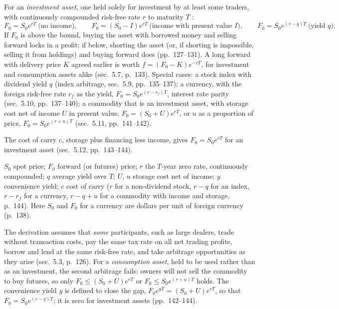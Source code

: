 \begin{qfresult}\label{res:cost-of-carry-forward-price}
 For an \emph{investment asset}, one held solely for investment by at least some traders, with continuously compounded risk-free rate $r$ to maturity $T$ \citep[chap.~5, ``Determination of Forward and Futures Prices'', secs.~5.1--5.6, pp.~124--132]{s7-hulloptions}:
\[ F_0=S_0e^{rT}\ \text{(no income)},\qquad F_0=(S_0-I)e^{rT}\ \text{(income with present value $I$)},\qquad F_0=S_0e^{(r-q)T}\ \text{(yield $q$)}. \]
If $F_0$ is above the bound, buying the asset with borrowed money and selling forward locks in a profit; if below, shorting the asset (or, if shorting is impossible, selling it from holdings) and buying forward does (pp.~127--131). A long forward with delivery price $K$ agreed earlier is worth $f=(F_0-K)e^{-rT}$, for investment and consumption assets alike (sec.~5.7, p.~133). Special cases: a stock index with dividend yield $q$ (index arbitrage, sec.~5.9, pp.~135--137); a currency, with the foreign risk-free rate $r_f$ as the yield, $F_0=S_0e^{(r-r_f)T}$, interest rate parity (sec.~5.10, pp.~137--140); a commodity that is an investment asset, with storage cost net of income $U$ in present value, $F_0=(S_0+U)e^{rT}$, or $u$ as a proportion of price, $F_0=S_0e^{(r+u)T}$ (sec.~5.11, pp.~141--142).

The cost of carry $c$, storage plus financing less income, gives $F_0=S_0e^{cT}$ for an investment asset (sec.~5.12, pp.~143--144).

 $S_0$ spot price; $F_0$ forward (or futures) price; $r$ the $T$-year zero rate, continuously compounded; $q$ average yield over $T$; $U$, $u$ storage cost net of income; $y$ convenience yield; $c$ cost of carry ($r$ for a non-dividend stock, $r-q$ for an index, $r-r_f$ for a currency, $r-q+u$ for a commodity with income and storage, p.~144). Here $S_0$ and $F_0$ for a currency are dollars per unit of foreign currency (p.~138).

 The derivation assumes that \emph{some} participants, such as large dealers, trade without transaction costs, pay the same tax rate on all net trading profits, borrow and lend at the same risk-free rate, and take arbitrage opportunities as they arise (sec.~5.3, p.~126). For a \emph{consumption asset}, held to be used rather than as an investment, the second arbitrage fails: owners will not sell the commodity to buy futures, so only $F_0\le(S_0+U)e^{rT}$ or $F_0\le S_0e^{(r+u)T}$ holds. The convenience yield $y$ is defined to close the gap, $F_0e^{yT}=(S_0+U)e^{rT}$, so that $F_0=S_0e^{(c-y)T}$; it is zero for investment assets (pp.~142--144).


\end{qfresult}
